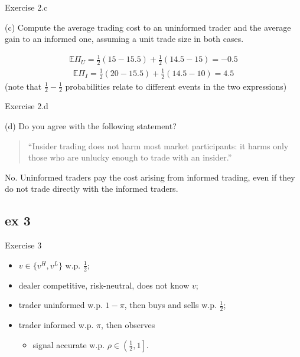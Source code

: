 \documentclass[english,10pt]{beamer}
\begin{document}
\begin{frame}{Exercise 2.c}
	\begin{exampleblock}{}
		(c) Compute the average trading cost to an uninformed trader and the average gain to an informed one, assuming a unit trade size in both cases.
	\end{exampleblock}
	\pause
	\begin{align*}
		\mathbb{E} \Pi_U = \frac{1}{2} (15-15.5) + \frac{1}{2} (14.5-15) = -0.5
	\end{align*}
	\begin{align*}
		\mathbb{E} \Pi_I = \frac{1}{2} (20 - 15.5) + \frac{1}{2} (14.5 - 10) = 4.5
	\end{align*}
	(note that $\frac{1}{2}-\frac{1}{2}$ probabilities relate to different events in the two expressions)
\end{frame}


\begin{frame}{Exercise 2.d}
	\begin{exampleblock}{}
		(d) Do you agree with the following statement? 
		\begin{quotation}
			\smallskip
			``Insider trading does not harm most market participants: it harms only those who are unlucky enough to trade with an insider.''
		\end{quotation}
	\end{exampleblock}
	\pause
	No. Uninformed traders pay the cost arising from informed trading, even if they do not trade directly with the informed traders.
\end{frame}




\subsection{ex 3}

\begin{frame}{Exercise 3}
	\begin{itemize}
		\item $v \in \{v^H,v^L\}$ w.p. $\frac{1}{2}$;
		\item dealer competitive, risk-neutral, does not know $v$;
		\item trader uninformed w.p. $1-\pi$, then buys and sells w.p. $\frac{1}{2}$;
		\item trader informed w.p. $\pi$, then observes 
		\begin{itemize}
			\item signal accurate w.p. $\rho \in \left(\frac{1}{2},1\right]$.
		\end{itemize}
	\end{itemize}
\end{frame}
\end{document}
